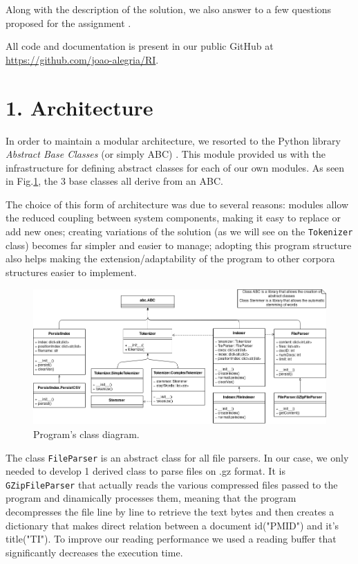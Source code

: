 \documentclass[12pt]{article}
\begin{document}
Along with the description of the solution, we also answer to a few questions
proposed for the assignment \cite{assign1}.

All code and documentation is present in our public GitHub at 
\newline \url{https://github.com/joao-alegria/RI}.

\newpage
\section*{1. Architecture}

In order to maintain a modular architecture, we resorted to the Python library 
{\it Abstract Base Classes\/} (or simply ABC) \cite{abclib}.
This module provided us with the infrastructure for defining abstract classes
for each of our own modules.
As seen in Fig.\ref{fig:classdiagram}, the 3 base classes all derive from 
an ABC.

The choice of this form of architecture was due to several reasons: modules
allow the reduced coupling between system components, making it easy to replace
or add new ones; creating variations of the solution (as we will see on the
\texttt{Tokenizer} class) becomes far simpler and easier to manage; adopting this 
program structure also helps making the extension/adaptability of the 
program to other corpora structures easier to implement.

\begin{figure}[h!]
  \includegraphics[width=\linewidth]{ClassDiagram_assign1.png}
  \caption{Program's class diagram.}
  \label{fig:classdiagram}
\end{figure}

The class \texttt{FileParser} is an abstract class for all file parsers.
In our case, we only needed to develop 1 derived class to parse files on
.gz format. 
It is \texttt{GZipFileParser} that actually reads the various compressed 
files passed to the program and dinamically processes them, meaning that
the program decompresses the file line by line to retrieve the text bytes 
and then creates a dictionary that makes direct relation between a document 
id("PMID") and it's title("TI").
To improve our reading performance we used a reading buffer that 
significantly decreases the execution time. 
\end{document}
